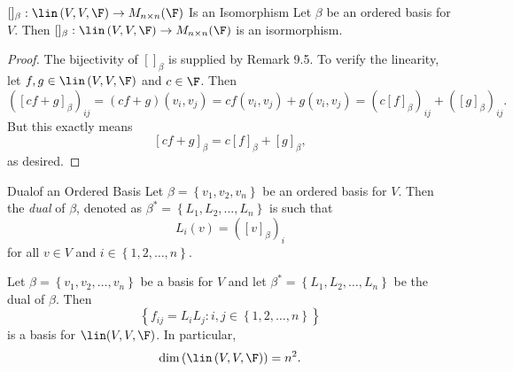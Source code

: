 \documentclass[linearalgebra]{subfiles}
\begin{document}
    \clearpage
    \begin{theorem}{$[]_\beta:\lin\left( V,V,\F \right)\to M_{n\times n}(\F)$ Is an Isomorphism}
        Let $\beta$ be an ordered basis for $V$. Then $[]_\beta:\lin\left( V,V,\F \right)\to M_{n\times n}(\F)$ is an isormorphism.
    \end{theorem}

    \begin{proof}
        The bijectivity of $[]_\beta$ is supplied by Remark 9.5. To verify the linearity, let $f,g\in\lin\left( V,V,\F \right)$ and $c\in\F$. Then
        \begin{equation*}
            \left( \left[ cf+g \right] _\beta \right) _{ij} = \left( cf+g \right) \left( v_i,v_j \right) = cf\left( v_i,v_j \right) + g\left( v_i,v_j \right) = \left( c\left[ f \right]_\beta  \right)_{ij} + \left( \left[ g \right]_\beta  \right) _{ij}.
        \end{equation*}
        But this exactly means
        \begin{equation*}
            \left[ cf+g \right] _\beta = c\left[ f \right] _\beta + \left[ g \right] _\beta,
        \end{equation*}
        as desired.
    \end{proof}

    \begin{recall}{Dual}{of an Ordered Basis}
        Let $\beta = \left\lbrace v_1,v_2,v_n \right\rbrace $ be an ordered basis for $V$. Then the \emph{dual} of $\beta$, denoted as $\beta^* = \left\lbrace L_1,L_2,\ldots,L_n \right\rbrace $ is such that
        \begin{equation*}
            L_i\left( v \right) = \left( \left[ v \right] _\beta \right) _i
        \end{equation*}
        for all $v\in V$ and $i\in\left\lbrace 1,2,\ldots,n \right\rbrace$.
    \end{recall}

    \begin{cor}{}
        Let $\beta = \left\lbrace v_1,v_2,\ldots,v_n \right\rbrace$ be a basis for $V$ and let $\beta^* = \left\lbrace L_1,L_2,\ldots,L_n \right\rbrace $ be the dual of $\beta$. Then
        \begin{equation*}
            \left\lbrace f_{ij} = L_iL_j: i,j\in\left\lbrace 1,2,\ldots,n \right\rbrace  \right\rbrace 
        \end{equation*}
        is a basis for $\lin(V,V,\F)$. In particular,
        \begin{equation*}
            \dim\left( \lin\left( V,V,\F \right)  \right) = n^2.
        \end{equation*}
    \end{cor}	
\end{document}
